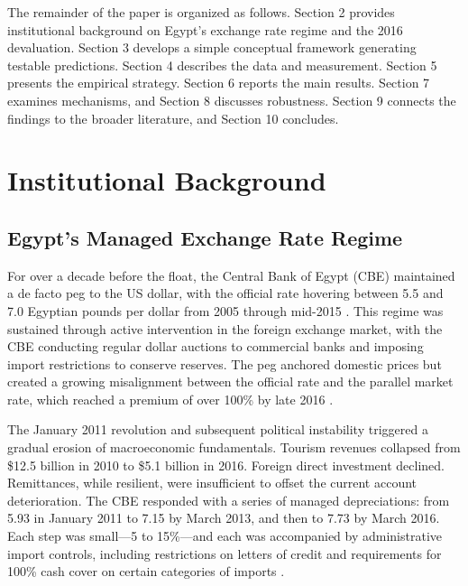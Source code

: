 \documentclass[12pt]{article}
\begin{document}
The remainder of the paper is organized as follows. Section 2 provides institutional background on Egypt's exchange rate regime and the 2016 devaluation. Section 3 develops a simple conceptual framework generating testable predictions. Section 4 describes the data and measurement. Section 5 presents the empirical strategy. Section 6 reports the main results. Section 7 examines mechanisms, and Section 8 discusses robustness. Section 9 connects the findings to the broader literature, and Section 10 concludes.


\section{Institutional Background}

\subsection{Egypt's Managed Exchange Rate Regime}

For over a decade before the float, the Central Bank of Egypt (CBE) maintained a de facto peg to the US dollar, with the official rate hovering between 5.5 and 7.0 Egyptian pounds per dollar from 2005 through mid-2015 \citep{imf2017egypt}. This regime was sustained through active intervention in the foreign exchange market, with the CBE conducting regular dollar auctions to commercial banks and imposing import restrictions to conserve reserves. The peg anchored domestic prices but created a growing misalignment between the official rate and the parallel market rate, which reached a premium of over 100\% by late 2016 \citep{worldbank2017egypt}.

The January 2011 revolution and subsequent political instability triggered a gradual erosion of macroeconomic fundamentals. Tourism revenues collapsed from \$12.5 billion in 2010 to \$5.1 billion in 2016. Foreign direct investment declined. Remittances, while resilient, were insufficient to offset the current account deterioration. The CBE responded with a series of managed depreciations: from 5.93 in January 2011 to 7.15 by March 2013, and then to 7.73 by March 2016. Each step was small---5 to 15\%---and each was accompanied by administrative import controls, including restrictions on letters of credit and requirements for 100\% cash cover on certain categories of imports \citep{capmas2017external}.
\end{document}
